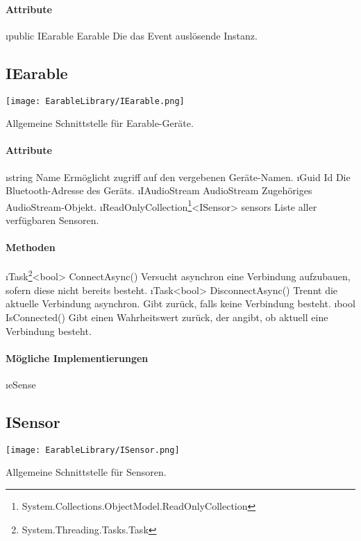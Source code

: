 \documentclass[../entwurf.tex]{subfiles}
\begin{document}
\paragraph{Attribute}
\begin{itemize}
	\i{public IEarable Earable} Die das Event auslösende  Instanz.
\end{itemize}

\subsection{IEarable}
\begin{center}
	\texttt{[image: EarableLibrary/IEarable.png]}
\end{center}
Allgemeine Schnittstelle für Earable-Geräte.
\paragraph{Attribute}
\begin{itemize}
	\i{string Name} Ermöglicht zugriff auf den vergebenen Geräte-Namen.
	\i{Guid Id} Die Bluetooth-Adresse des Geräts.
	\i{IAudioStream AudioStream} Zugehöriges AudioStream-Objekt.
	\i{ReadOnlyCollection\footnote{System.Collections.ObjectModel.ReadOnlyCollection}<ISensor> sensors} Liste aller verfügbaren Sensoren.
\end{itemize}
\paragraph{Methoden}
\begin{itemize}
	\i{Task\footnote{System.Threading.Tasks.Task}<bool> ConnectAsync()} Versucht asynchron eine Verbindung aufzubauen, sofern diese nicht bereits besteht.
	\i{Task<bool> DisconnectAsync()} Trennt die aktuelle Verbindung asynchron. Gibt  zurück, falls keine Verbindung besteht.
	\i{bool IsConnected()} Gibt einen Wahrheitswert zurück, der angibt, ob aktuell eine Verbindung besteht.
\end{itemize}
\paragraph{Mögliche Implementierungen}
\begin{itemize}
	\i{eSense}
\end{itemize}

\subsection{ISensor}
\begin{center}
	\texttt{[image: EarableLibrary/ISensor.png]}
\end{center}
Allgemeine Schnittstelle für Sensoren.
\end{document}
